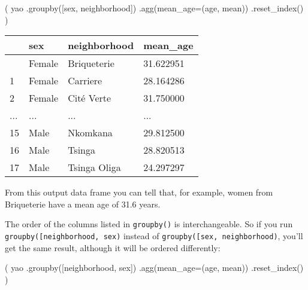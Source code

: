 \documentclass[
  letterpaper,
  DIV=11,
  numbers=noendperiod]{scrreprt}
\newenvironment{Shaded}{\begin{snugshade}}{\end{snugshade}}
\newcommand{\NormalTok}[1]{\textcolor[rgb]{0.00,0.23,0.31}{#1}}
\newcommand{\OperatorTok}[1]{\textcolor[rgb]{0.37,0.37,0.37}{#1}}
\newcommand{\StringTok}[1]{\textcolor[rgb]{0.13,0.47,0.30}{#1}}
\begin{document}
\begin{Shaded}
\begin{Highlighting}[]
\NormalTok{(}
\NormalTok{    yao}
\NormalTok{    .groupby([}\StringTok{\textquotesingle{}sex\textquotesingle{}}\NormalTok{, }\StringTok{\textquotesingle{}neighborhood\textquotesingle{}}\NormalTok{])}
\NormalTok{    .agg(mean\_age}\OperatorTok{=}\NormalTok{(}\StringTok{\textquotesingle{}age\textquotesingle{}}\NormalTok{, }\StringTok{\textquotesingle{}mean\textquotesingle{}}\NormalTok{))}
\NormalTok{    .reset\_index()}
\NormalTok{)}
\end{Highlighting}
\end{Shaded}

\begin{longtable}[]{@{}llll@{}}
\toprule\noalign{}
& sex & neighborhood & mean\_age \\
\midrule\noalign{}
\endhead
\bottomrule\noalign{}
\endlastfoot
0 & Female & Briqueterie & 31.622951 \\
1 & Female & Carriere & 28.164286 \\
2 & Female & Cité Verte & 31.750000 \\
... & ... & ... & ... \\
15 & Male & Nkomkana & 29.812500 \\
16 & Male & Tsinga & 28.820513 \\
17 & Male & Tsinga Oliga & 24.297297 \\
\end{longtable}

From this output data frame you can tell that, for example, women from
Briqueterie have a mean age of 31.6 years.

The order of the columns listed in \texttt{groupby()} is
interchangeable. So if you run
\texttt{groupby({[}\textquotesingle{}neighborhood\textquotesingle{},\ \textquotesingle{}sex\textquotesingle{}{]})}
instead of
\texttt{groupby({[}\textquotesingle{}sex\textquotesingle{},\ \textquotesingle{}neighborhood\textquotesingle{}{]})},
you'll get the same result, although it will be ordered differently:

\begin{Shaded}
\begin{Highlighting}[]
\NormalTok{(}
\NormalTok{    yao}
\NormalTok{    .groupby([}\StringTok{\textquotesingle{}neighborhood\textquotesingle{}}\NormalTok{, }\StringTok{\textquotesingle{}sex\textquotesingle{}}\NormalTok{])}
\NormalTok{    .agg(mean\_age}\OperatorTok{=}\NormalTok{(}\StringTok{\textquotesingle{}age\textquotesingle{}}\NormalTok{, }\StringTok{\textquotesingle{}mean\textquotesingle{}}\NormalTok{))}
\NormalTok{    .reset\_index()}
\NormalTok{)}
\end{Highlighting}
\end{Shaded}
\end{document}
